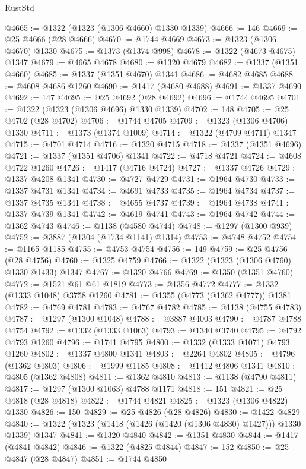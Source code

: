 \begin{lexlean}{RustStd}
\begin{coremodule}
@4665 := @1322 (@1323 (@1306 @4660) @1330 @1339)
@4666 := 146
@4669 := @25 @4666 (@28 @4666)
@4670 := @1744 @4669
@4673 := @1323 (@1306 @4670) @1330
@4675 := @1373 (@1374 @998)
@4678 := @1322 (@4673 @4675) @1347
@4679 := @4665 @4678
@4680 := @1320 @4679
@4682 := @1337 (@1351 @4660)
@4685 := @1337 (@1351 @4670) @1341
@4686 := @4682 @4685
@4688 := @4608 @4686 @1260
@4690 := @1417 (@4680 @4688)
@4691 := @1337 @4690
@4692 := 147
@4695 := @25 @4692 (@28 @4692)
@4696 := @1744 @4695
@4701 := @1322 (@1323 (@1306 @4696) @1330 @1339)
@4702 := 148
@4705 := @25 @4702 (@28 @4702)
@4706 := @1744 @4705
@4709 := @1323 (@1306 @4706) @1330
@4711 := @1373 (@1374 @1009)
@4714 := @1322 (@4709 @4711) @1347
@4715 := @4701 @4714
@4716 := @1320 @4715
@4718 := @1337 (@1351 @4696)
@4721 := @1337 (@1351 @4706) @1341
@4722 := @4718 @4721
@4724 := @4608 @4722 @1260
@4726 := @1417 (@4716 @4724)
@4727 := @1337 @4726
@4729 := @1337 @4208 @1341
@4730 := @4727 @4729
@4731 := @1964 @4730
@4733 := @1337 @4731 @1341
@4734 := @4691 @4733
@4735 := @1964 @4734
@4737 := @1337 @4735 @1341
@4738 := @4655 @4737
@4739 := @1964 @4738
@4741 := @1337 @4739 @1341
@4742 := @4619 @4741
@4743 := @1964 @4742
@4744 := @1362 @4743
@4746 := @1138 (@4580 @4744)
@4748 := @1297 (@1300 @939)
@4752 := @3887 (@1304 (@1734 @1141) @1314)
@4753 := @4748 @4752
@4754 := @1165 @1185
@4755 := @4753 @4754
@4756 := 149
@4759 := @25 @4756 (@28 @4756)
@4760 := @1325 @4759
@4766 := @1322 (@1323 (@1306 @4760) @1330 @1433) @1347
@4767 := @1320 @4766
@4769 := @1350 (@1351 @4760)
@4772 := @1521 @61 @61 @1819
@4773 := @1356 @4772
@4777 := @1332 (@1333 @1048) @3758 @1260
@4781 := @1355 (@4773 (@1362 @4777)) @1381
@4782 := @4769 @4781
@4783 := @4767 @4782
@4785 := @1138 (@4755 @4783)
@4787 := @1297 (@1300 @1048)
@4788 := @3887 @4003
@4790 := @4787 @4788 @4754
@4792 := @1332 (@1333 @1063)
@4793 := @1340 @3740
@4795 := @4792 @4793 @1260
@4796 := @1741 @4795
@4800 := @1332 (@1333 @1071) @4793 @1260
@4802 := @1337 @4800 @1341
@4803 := @2264 @4802
@4805 := @4796 (@1362 @4803)
@4806 := @1999 @1185
@4808 := @1412 @4806 @1341
@4810 := @4805 (@1362 @4808)
@4811 := @1362 @4810
@4813 := @1138 (@4790 @4811)
@4817 := @1297 (@1300 @1063) @4788 @1171
@4818 := 151
@4821 := @25 @4818 (@28 @4818)
@4822 := @1744 @4821
@4825 := @1323 (@1306 @4822) @1330
@4826 := 150
@4829 := @25 @4826 (@28 @4826)
@4830 := @1422 @4829
@4840 := @1322 (@1323 (@1418 (@1426 (@1420 (@1306 @4830) @1427))) @1330 @1339) @1347
@4841 := @1320 @4840
@4842 := @1351 @4830
@4844 := @1417 (@4841 @4842)
@4846 := @1322 (@4825 @4844)
@4847 := 152
@4850 := @25 @4847 (@28 @4847)
@4851 := @1744 @4850

\end{coremodule}
\end{lexlean}
